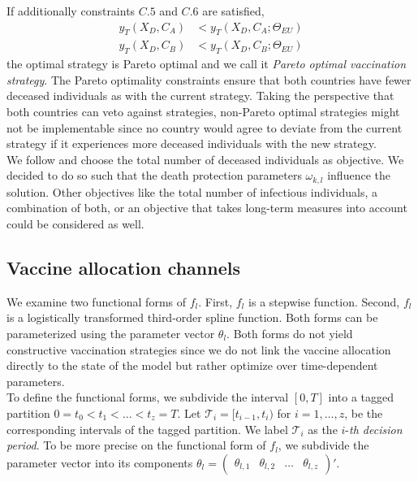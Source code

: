If additionally constraints $C.5$ and $C.6$ are satisfied, 
\begin{align}
y_T(X_D, C_A) &< y_T(X_D, C_A; \Theta_{EU}) \tag{C.5} \\
y_T(X_D, C_B) &< y_T(X_D, C_B; \Theta_{EU}) \tag{C.6}
\end{align}
the optimal strategy is Pareto optimal and we call it \textit{Pareto optimal vaccination strategy}. The Pareto optimality constraints ensure that both countries have fewer deceased individuals as with the current strategy. Taking the perspective that both countries can veto against strategies, non-Pareto optimal strategies might not be implementable since no country would agree to deviate from the current strategy if it experiences more deceased individuals with the new strategy.\\

We follow \cite{Bertsimas.2020} and choose the total number of deceased individuals as objective. We decided to do so such that the death protection parameters $\omega_{k,l}$ influence the solution. Other objectives like the total number of infectious individuals, a combination of both, or an objective that takes long-term measures into account could be considered as well.  \\

\subsection{Vaccine allocation channels}
We examine two functional forms of $f_{l}$. First, $f_{l}$ is a stepwise function. Second, $f_{l}$ is a logistically transformed third-order spline function. Both forms can be parameterized using the parameter vector $\theta_l$. Both forms do not yield constructive vaccination strategies since we do not link the vaccine allocation directly to the state of the model but rather optimize over time-dependent parameters.\\

To define the functional forms, we subdivide the interval $[0,T]$ into a tagged partition $0=t_0 < t_1 < \dots < t_z = T$. Let $\mathcal{T}_i = [t_{i-1}, t_{i})$ for $i = 1, \dots, z$, be the corresponding intervals of the tagged partition. We label $\mathcal{T}_i$ as the $i$-\textit{th decision period}. To be more precise on the functional form of $f_l$, we subdivide the parameter vector into its components $\theta_l = \begin{pmatrix}
\theta_{l,1}  & \theta_{l,2} & \dots & \theta_{l,z} \end{pmatrix}'$. \\

